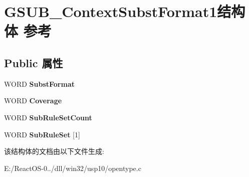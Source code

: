 \hypertarget{struct_g_s_u_b___context_subst_format1}{}\section{G\+S\+U\+B\+\_\+\+Context\+Subst\+Format1结构体 参考}
\label{struct_g_s_u_b___context_subst_format1}
\subsection*{Public 属性}
\begin{DoxyCompactItemize}
\item 
\mbox{\label{struct_g_s_u_b___context_subst_format1_a8e51183ac889c7144842028ae3cdc41e}} 
W\+O\+RD {\bfseries Subst\+Format}
\item 
\mbox{\label{struct_g_s_u_b___context_subst_format1_a84ef04dec9aec89e0d893fe1dd5f281f}} 
W\+O\+RD {\bfseries Coverage}
\item 
\mbox{\label{struct_g_s_u_b___context_subst_format1_a045ec95e75c7951bfc0aaf935cece517}} 
W\+O\+RD {\bfseries Sub\+Rule\+Set\+Count}
\item 
\mbox{\label{struct_g_s_u_b___context_subst_format1_a1890277b7b7463a2005d8481956de000}} 
W\+O\+RD {\bfseries Sub\+Rule\+Set} \mbox{[}1\mbox{]}
\end{DoxyCompactItemize}


该结构体的文档由以下文件生成\+:\begin{DoxyCompactItemize}
\item 
E\+:/\+React\+O\+S-\/0../dll/win32/usp10/opentype.\+c\end{DoxyCompactItemize}

